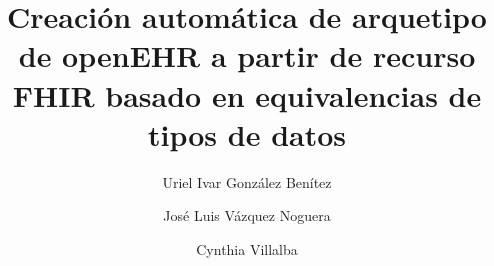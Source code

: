 \title{Creación automática de arquetipo de openEHR a partir de recurso FHIR basado en equivalencias de tipos de datos}

\author{Uriel Ivar González Benítez}

\author{José Luis Vázquez Noguera}

\author{Cynthia Villalba}
